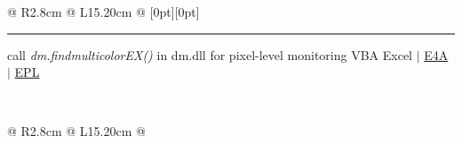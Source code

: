 {{\begin{tabularx}{\linewidth}{@{} R{2.8cm} @{\phantom{d}} L{15.20cm} @{}}
\vspace{-3pt} \hspace{11.8pt} \raisebox{0.18\height}[0pt][0pt]{\vrule width0.5pt height14.5pt} \hspace{-0.30em}\rule[0.25em]{1.1em}{0.5pt}\!\! \raisebox{0.2\height}{\scriptsize $\blacktriangleright$} {\small call \textit{dm.findmulticolorEX()} in dm.dll for pixel-level monitoring} \hfill {\small \color{color-detail} VBA Excel $|$ \href{https://www.e4asoft.com}{E4A} $|$ \href{https://www.dywt.com.cn}{EPL}} \href{https://youtu.be/9vrWQo7oZK4}{\raisebox{-0.05\height}{\color{youtube_red!50}\faYoutube}} \href{https://github.com/ChenZhu-Xie/Stardust_DDTank}{\color{black!50}\faGithub} \\ \Gap\Gap\Gap
\end{tabularx}
\\
\begin{tabularx}{\linewidth}{@{} R{2.8cm} @{\phantom{d}} L{15.20cm} @{}}

\end{tabularx}}}
